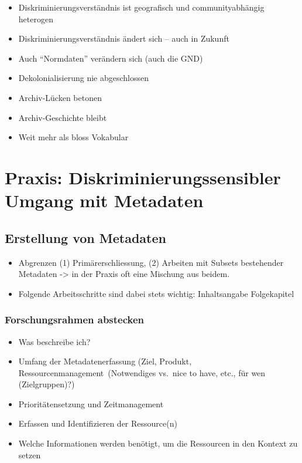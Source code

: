 \documentclass[
  letterpaper,
  DIV=11,
  numbers=noendperiod]{scrartcl}
\providecommand{\tightlist}{%
  \setlength{\itemsep}{0pt}\setlength{\parskip}{0pt}}\usepackage{longtable,booktabs,array}
\begin{document}
\begin{itemize}
\begin{itemize}
\begin{itemize}
      \begin{itemize}
      \tightlist
      \item
        Diskriminierungsverständnis ist geografisch und
        communityabhängig heterogen
      \item
        Diskriminierungsverständnis ändert sich -- auch in Zukunft
      \item
        Auch ``Normdaten'' verändern sich (auch die GND)
      \item
        Dekolonialisierung nie abgeschlossen
      \item
        Archiv-Lücken betonen
      \item
        Archiv-Geschichte bleibt
      \item
        Weit mehr als bloss Vokabular
      \end{itemize}
    \end{itemize}
  \end{itemize}
\end{itemize}

\section{Praxis: Diskriminierungssensibler Umgang mit
Metadaten}\label{praxis-diskriminierungssensibler-umgang-mit-metadaten}

\subsection{Erstellung von Metadaten}\label{erstellung-von-metadaten}

\begin{itemize}
\tightlist
\item
  Abgrenzen (1) Primärerschliessung, (2) Arbeiten mit Subsets
  bestehender Metadaten -\textgreater{} in der Praxis oft eine Mischung
  aus beidem.
\item
  Folgende Arbeitsschritte sind dabei stets wichtig: Inhaltsangabe
  Folgekapitel
\end{itemize}

\subsubsection{Forschungsrahmen
abstecken}\label{forschungsrahmen-abstecken}

\begin{itemize}
\tightlist
\item
  Was beschreibe ich?
\item
  Umfang der Metadatenerfassung (Ziel, Produkt,
  Ressourcenmanagement~(Notwendiges vs.~nice to have, etc., für wen
  (Zielgruppen)?)
\item
  Prioritätensetzung und Zeitmanagement\\
\item
  Erfassen und Identifizieren der Ressource(n)
\item
  Welche Informationen werden benötigt, um die Ressourcen in den Kontext
  zu setzen
\end{itemize}
\end{document}
